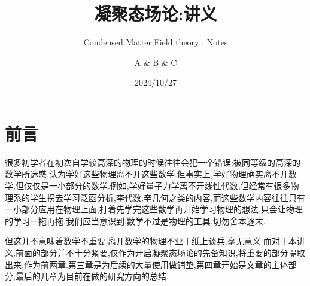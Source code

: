 \documentclass[lang=cn,newtx,10pt,scheme=chinese,thmcnt=section]{elegantbook}
\title{凝聚态场论:讲义}
\subtitle{Condensed Matter Field theory : Notes}
\author{A \& B \& C}
\institute{Group 530}
\date{2024/10/27}
\begin{document}
\maketitle
\frontmatter

\tableofcontents

\mainmatter











\chapter*{前言}
很多初学者在初次自学较高深的物理的时候往往会犯一个错误:被同等级的高深的数学所迷惑,认为学好这些物理离不开这些数学.但事实上,学好物理确实离不开数学,但仅仅是一小部分的数学.例如,学好量子力学离不开线性代数,但经常有很多物理系的学生拐去学习泛函分析,李代数,辛几何之类的内容,而这些数学内容往往只有一小部分应用在物理上面,打着先学完这些数学再开始学习物理的想法,只会让物理的学习一拖再拖.我们应当意识到,数学不过是物理的工具,切勿舍本逐末.

但这并不意味着数学不重要,离开数学的物理不亚于纸上谈兵,毫无意义.而对于本讲义,前面的部分并不十分紧要,仅作为开启凝聚态场论的先备知识,将重要的部分提取出来,作为前两章.第三章是为后续的大量使用做铺垫,第四章开始是文章的主体部分,最后的几章为目前在做的研究方向的总结.
\end{document}
